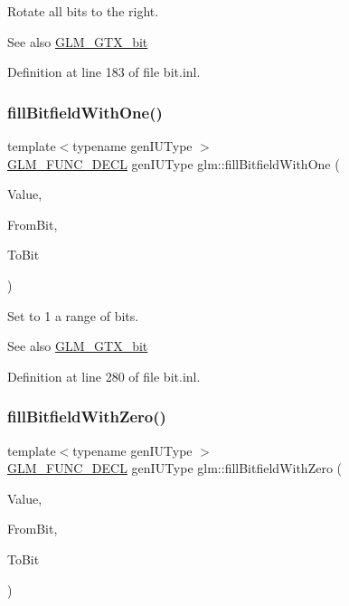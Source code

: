 Rotate all bits to the right. \begin{DoxySeeAlso}{See also}
\hyperlink{group__gtx__bit}{G\+L\+M\+\_\+\+G\+T\+X\+\_\+bit} 
\end{DoxySeeAlso}


Definition at line 183 of file bit.\+inl.

\mbox{\label{group__gtx__bit_gafac2a9e0ef0d5d2fc4e569bff2b2f452}} 
\subsubsection{\texorpdfstring{fill\+Bitfield\+With\+One()}{fillBitfieldWithOne()}}
{\footnotesize\ttfamily template$<$typename gen\+I\+U\+Type $>$ \\
\hyperlink{setup_8hpp_ab2d052de21a70539923e9bcbf6e83a51}{G\+L\+M\+\_\+\+F\+U\+N\+C\+\_\+\+D\+E\+CL} gen\+I\+U\+Type glm\+::fill\+Bitfield\+With\+One (\begin{DoxyParamCaption}\item[{gen\+I\+U\+Type const \&}]{Value,  }\item[{int const \&}]{From\+Bit,  }\item[{int const \&}]{To\+Bit }\end{DoxyParamCaption})}

Set to 1 a range of bits. \begin{DoxySeeAlso}{See also}
\hyperlink{group__gtx__bit}{G\+L\+M\+\_\+\+G\+T\+X\+\_\+bit} 
\end{DoxySeeAlso}


Definition at line 280 of file bit.\+inl.

\mbox{\label{group__gtx__bit_ga0c514d45387003260783ba6a8a4f3285}} 
\subsubsection{\texorpdfstring{fill\+Bitfield\+With\+Zero()}{fillBitfieldWithZero()}}
{\footnotesize\ttfamily template$<$typename gen\+I\+U\+Type $>$ \\
\hyperlink{setup_8hpp_ab2d052de21a70539923e9bcbf6e83a51}{G\+L\+M\+\_\+\+F\+U\+N\+C\+\_\+\+D\+E\+CL} gen\+I\+U\+Type glm\+::fill\+Bitfield\+With\+Zero (\begin{DoxyParamCaption}\item[{gen\+I\+U\+Type const \&}]{Value,  }\item[{int const \&}]{From\+Bit,  }\item[{int const \&}]{To\+Bit }\end{DoxyParamCaption})}

